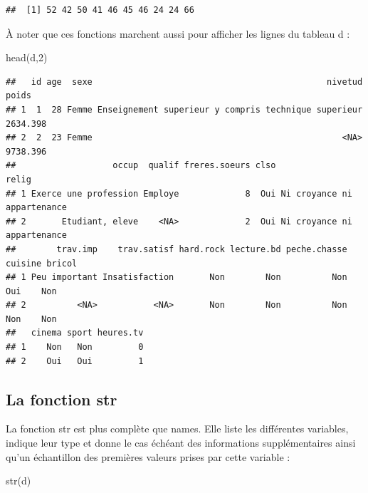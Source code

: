 \documentclass[
]{book}
\newenvironment{Shaded}{\begin{snugshade}}{\end{snugshade}}
\newcommand{\DecValTok}[1]{\textcolor[rgb]{0.00,0.00,0.81}{#1}}
\newcommand{\FunctionTok}[1]{\textcolor[rgb]{0.00,0.00,0.00}{#1}}
\newcommand{\NormalTok}[1]{#1}
\begin{document}
\begin{verbatim}
##  [1] 52 42 50 41 46 45 46 24 24 66
\end{verbatim}

À noter que ces fonctions marchent aussi pour afficher les lignes du tableau d :

\begin{Shaded}
\begin{Highlighting}[]
\FunctionTok{head}\NormalTok{(d,}\DecValTok{2}\NormalTok{)}
\end{Highlighting}
\end{Shaded}

\begin{verbatim}
##   id age  sexe                                              nivetud    poids
## 1  1  28 Femme Enseignement superieur y compris technique superieur 2634.398
## 2  2  23 Femme                                                 <NA> 9738.396
##                   occup  qualif freres.soeurs clso                       relig
## 1 Exerce une profession Employe             8  Oui Ni croyance ni appartenance
## 2       Etudiant, eleve    <NA>             2  Oui Ni croyance ni appartenance
##        trav.imp    trav.satisf hard.rock lecture.bd peche.chasse cuisine bricol
## 1 Peu important Insatisfaction       Non        Non          Non     Oui    Non
## 2          <NA>           <NA>       Non        Non          Non     Non    Non
##   cinema sport heures.tv
## 1    Non   Non         0
## 2    Oui   Oui         1
\end{verbatim}

\hypertarget{la-fonction-str}{%
\subsection{\texorpdfstring{La fonction \textbf{str}}{La fonction str}}\label{la-fonction-str}}

La fonction str est plus complète que names. Elle liste les différentes variables, indique leur type et donne le cas échéant des informations supplémentaires ainsi qu'un échantillon des premières valeurs prises par cette variable :

\begin{Shaded}
\begin{Highlighting}[]
\FunctionTok{str}\NormalTok{(d)}
\end{Highlighting}
\end{Shaded}
\end{document}
